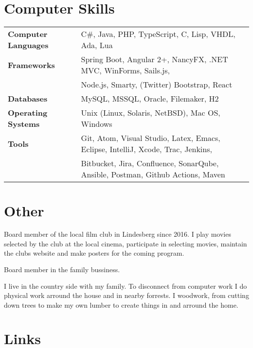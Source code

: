\documentclass{cv-stylish}
\begin{document}
\begin{center}
\section{Computer Skills}

\begin{tabular}{ @{} >{\bfseries}l @{\hspace{6ex}} l }
Computer Languages & C\#, Java, PHP, TypeScript, C, Lisp, VHDL, Ada, Lua \\
Frameworks & Spring Boot, Angular 2+, NancyFX, .NET MVC, WinForms, Sails.js, \\
         & Node.js, Smarty, (Twitter) Bootstrap, React \\
Databases & MySQL, MSSQL, Oracle, Filemaker, H2 \\
Operating Systems & Unix (Linux, Solaris, NetBSD), Mac OS, Windows \\
Tools & Git, Atom, Visual Studio, Latex, Emacs, Eclipse, IntelliJ,
        Xcode, Trac,  Jenkins, \\
      & Bitbucket, Jira, Confluence, SonarQube, Ansible,
        Postman, Github Actions, Maven
\end{tabular}



\section{Other}

\begin{InfoBody}
Board member of the local film club in Lindesberg since 2016. I play
movies selected by the club at the local cinema, participate in
selecting movies, maintain the clubs website and make posters for the
coming program.

Board member in the family bussiness.

I live in the country side with my family. To disconnect from
computer work I do physical work arround the house and in nearby
forrests. I woodwork, from cutting down trees to make my own lumber to
create things in and arround the home.
\end{InfoBody}



\section{Links}
\begin{InfoBody}

 \hfill
{}

\end{InfoBody}

\end{center}
\end{document}
